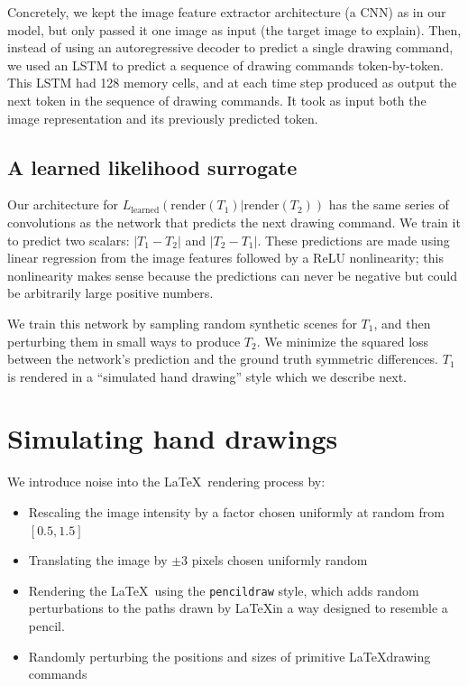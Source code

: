 \documentclass{article}
\begin{document}
Concretely, we kept the image feature extractor architecture (a CNN) as in our model,
but only passed it one image as input (the target image to explain).
Then, instead of using an autoregressive decoder to predict a single drawing command,
we used an LSTM to predict a sequence of drawing commands token-by-token.
This LSTM had 128 memory cells,
and at each time step produced as output the next token in the sequence of drawing commands.
It took as input both the image representation and its previously predicted token.


\subsection{A learned likelihood surrogate}

Our architecture for
$L_{\text{learned}}(\text{render}(T_1)|\text{render}(T_2))$ has the
same series of convolutions as the network that predicts the next
drawing command. We train it to predict two scalars: $|T_1 - T_2|$ and
$|T_2 - T_1|$.  These predictions are made using linear regression
from the image features followed by a ReLU nonlinearity; this
nonlinearity makes sense because the predictions can never be negative
but could be arbitrarily large positive numbers.

We train this network by sampling random synthetic scenes for $T_1$,
and then perturbing them in small ways to produce $T_2$.
We minimize the squared loss between the network's prediction and the ground truth symmetric differences.
$T_1$ is rendered in a ``simulated hand drawing'' style which we describe next.

\section{Simulating hand drawings}

We introduce noise into the \LaTeX~rendering process by:

\begin{itemize}
\item Rescaling the image intensity by a factor chosen uniformly at random from $[0.5,1.5]$
\item Translating the image by $\pm 3$ pixels chosen uniformly random
\item Rendering the \LaTeX~using the \verb|pencildraw| style,
  which adds random perturbations to the paths drawn by \LaTeX in a way designed to resemble a pencil.
\item Randomly perturbing the positions and sizes of primitive  \LaTeX drawing commands
\end{itemize}
\end{document}
